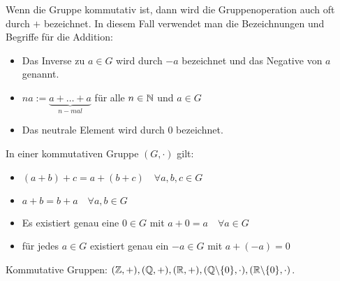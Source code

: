 \begin{bem}
Wenn die Gruppe kommutativ ist, dann wird die Gruppenoperation auch oft durch $ + $ bezeichnet. In diesem Fall verwendet man die Bezeichnungen und Begriffe für die Addition:
\begin{itemize}
	\item Das Inverse zu $ a \in G $ wird durch $ -a $ bezeichnet und das Negative von $ a $ genannt.
	\item $ na := \underbrace{a+ \ldots + a}_{n-mal} $ für alle $ n \in \mathbb N $ und $ a \in G $
	\item Das neutrale Element wird durch $ 0 $ bezeichnet.
\end{itemize}
In einer kommutativen Gruppe $ (G, \cdot) $ gilt:
\begin{itemize}
	\item
	$ (a+b)+c = a+(b+c) \quad \forall a,b,c \in G $
	\item
	$ a+b = b+a \quad \forall a,b \in G $
	\item
	Es existiert genau eine $ 0 \in G $ mit $ a+0 = a \quad \forall a \in G $
	\item
	für jedes $ a \in G $ existiert genau ein $ -a \in G $ mit $ a+ (-a) = 0 $
\end{itemize}
\end{bem}

\begin{bsp}
	Kommutative Gruppen: \hfill $ (\mathbb{Z}, +), \hfill (\mathbb{Q}, +), \hfill (\mathbb{R}, +), \hfill (\mathbb{Q} \backslash \{0\}, \cdot ), \hfill (\mathbb{R} \backslash \{0\}, \cdot ) $.
\end{bsp}


